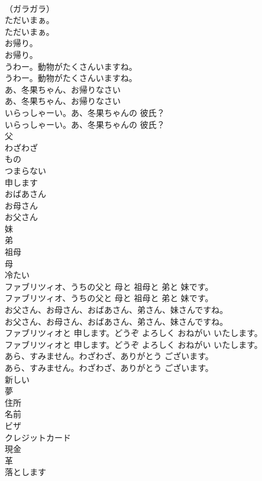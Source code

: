 \documentclass[8pt]{extreport}
\begin{document}
\begin{CJK}{UTF8}{min}
\\	（ガラガラ）	
\\	ただいまぁ。	
\\	ただいまぁ。 
\\	お帰り。	
\\	お帰り。 
\\	うわー。動物がたくさんいますね。	
\\	うわー。動物がたくさんいますね。 
\\	あ、冬果ちゃん、お帰りなさい	
\\	あ、冬果ちゃん、お帰りなさい 
\\	いらっしゃーい。あ、冬果ちゃんの 彼氏？	
\\	いらっしゃーい。あ、冬果ちゃんの 彼氏？ 
\\	父
\\	わざわざ
\\	もの
\\	つまらない
\\	申します
\\	おばあさん
\\	お母さん
\\	お父さん
\\	妹
\\	弟
\\	祖母
\\	母
\\	冷たい
\\	ファブリツィオ、うちの父と 母と 祖母と 弟と 妹です。	
\\	ファブリツィオ、うちの父と 母と 祖母と 弟と 妹です。 
\\	お父さん、お母さん、おばあさん、弟さん、妹さんですね。	
\\	お父さん、お母さん、おばあさん、弟さん、妹さんですね。 
\\	ファブリツィオと 申します。どうぞ よろしく おねがい いたします。	
\\	ファブリツィオと 申します。どうぞ よろしく おねがい いたします。 
\\	あら、すみません。わざわざ、ありがとう ございます。	
\\	あら、すみません。わざわざ、ありがとう ございます。 
\\	新しい
\\	夢
\\	住所
\\	名前
\\	ビザ
\\	クレジットカード
\\	現金
\\	革
\\	落とします

\end{CJK}
\end{document}
